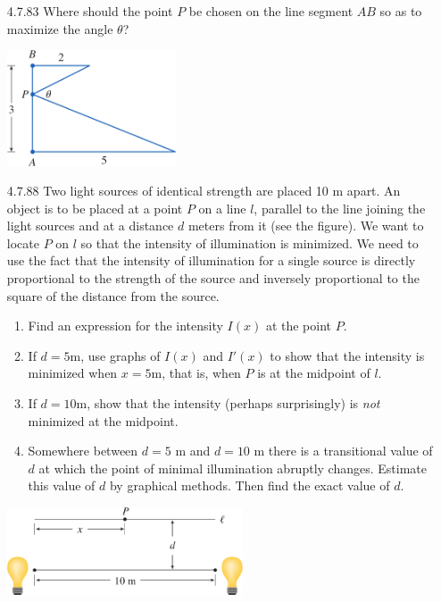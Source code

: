 \documentclass{article}
\begin{document}
\begin{enumerate}
\vspace{6cm}

\item[4.7.83]
    Where should the point $P$ be chosen on the line segment $AB$ so as to
    maximize the angle $ \theta $?

    \begin{center}
        \includegraphics[width=5cm]{./png/4.7.83.png}
    \end{center}

\newpage

\item[4.7.88]
    Two light sources of identical strength are placed 10 m apart.
    An object is to be placed at a point $P$ on a line $l$, parallel to
    the line joining the light sources and at a distance $d$ meters
    from it (see the figure). We want to locate $P$ on $l$ so that the
    intensity of illumination is minimized. We need to use the fact
    that the intensity of illumination for a single source is directly
    proportional to the strength of the source and inversely proportional
    to the square of the distance from the source.

    \begin{enumerate}
        \item Find an expression for the intensity $I(x)$ at the point $P$.
        \item If $d = 5$m, use graphs of $I(x)$ and $I'(x)$ to show that
            the intensity is minimized when $x=5$m, that is, when $P$ is
            at the midpoint of $l$.
        \item If $d = 10$m, show that the intensity (perhaps surprisingly)
            is \textit{not} minimized at the midpoint.
        \item Somewhere between $d=5$ m and $d=10$ m there is a transitional
            value of $d$ at which the point of minimal illumination abruptly
            changes. Estimate this value of $d$ by graphical methods.
            Then find the exact value of $d$.
    \end{enumerate}

    \begin{center}
        \includegraphics[width=7cm]{./png/4.7.88.png}
    \end{center}


\end{enumerate}
\end{document}
